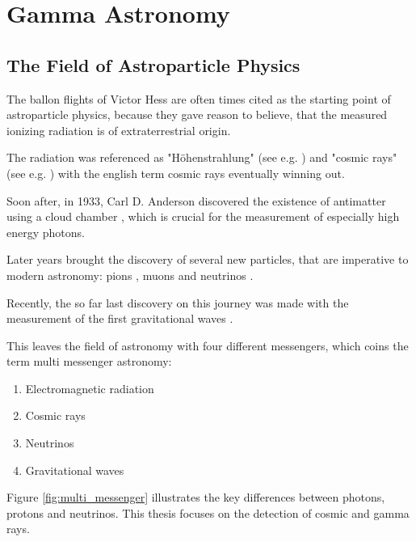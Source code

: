 \chapter{Gamma Astronomy}

\section{The Field of Astroparticle Physics}

The ballon flights of Victor Hess \cite{Hess:1912srp} are
often times cited as the starting point of astroparticle physics,
because they gave reason to believe, that the measured ionizing
radiation is of extraterrestrial origin. 

The radiation was referenced as "Höhenstrahlung" 
(see e.g. \cite{myssowsky1926versuche}) 
and "cosmic rays" (see e.g. \cite{millikan1928origin}) with 
the english term cosmic rays eventually winning out.

Soon after, in 1933, Carl D. Anderson discovered the existence
of antimatter using a cloud chamber \cite{PhysRev.43.491},
which is crucial for the measurement of especially
high energy photons.

Later years brought the discovery of several new particles,
that are imperative to modern astronomy:
pions \cite{LATTES1947}, muons \cite{PhysRev.52.1003}
and neutrinos \cite{Cowan103}.

Recently, the so far last discovery on this journey
was made with the measurement of the first gravitational 
waves \cite{PhysRevLett.118.221101}.

This leaves the field of astronomy with four different
messengers, which coins the term
multi messenger astronomy:
\begin{enumerate}
	\item Electromagnetic radiation
	\item Cosmic rays
	\item Neutrinos
	\item Gravitational waves
\end{enumerate}

Figure \ref{fig:multi_messenger} illustrates the key differences between
photons, protons and neutrinos.
This thesis focuses on the detection of cosmic and gamma rays.

